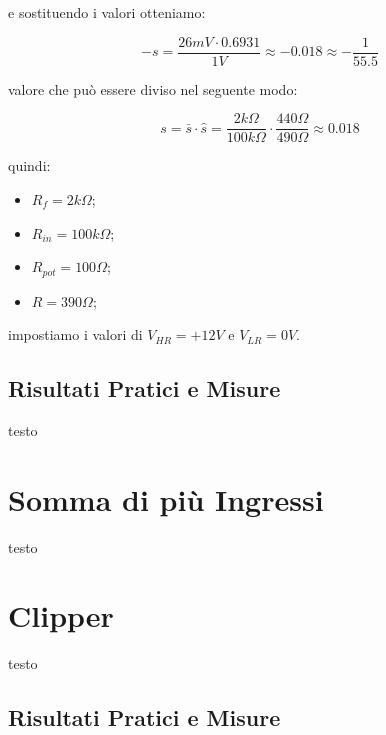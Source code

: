 e sostituendo i valori otteniamo:

$$-s=\frac{26mV\cdot 0.6931}{1V}\approx-0.018\approx-\frac{1}{55.5}$$

valore che può essere diviso nel seguente modo:

$$
    s=\bar{s}\cdot\hat{s}=\frac{2k\Omega}{100k\Omega}\cdot\frac{440\Omega}{490\Omega}
    \approx 0.018
$$

quindi:


\begin{itemize}
    \item $R_f = 2k\Omega$;
    \item $R_{in} = 100k\Omega$;
    \item $R_{pot} = 100\Omega$;
    \item $R = 390\Omega$;
\end{itemize}

impostiamo i valori di $V_{HR}=+12V$ e $V_{LR}=0V$.



\subsection*{Risultati Pratici e Misure}


testo


\section{Somma di più Ingressi}


testo


\section{Clipper}


testo


\subsection*{Risultati Pratici e Misure}

